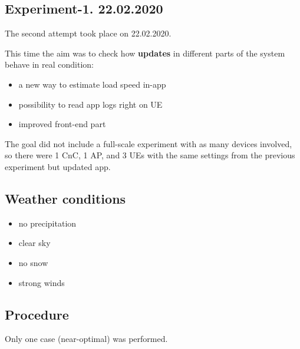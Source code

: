 \hypertarget{experiment-1.-22.02.2020}{%
\subsection{Experiment-1. 22.02.2020}\label{experiment-1.-22.02.2020}}

The second attempt took place on 22.02.2020.

This time the aim was to check how \textbf{updates} in different parts
of the system behave in real condition:

\begin{itemize}
\tightlist
\item
  a new way to estimate load speed in-app
\item
  possibility to read app logs right on UE
\item
  improved front-end part
\end{itemize}

The goal did not include a full-scale experiment with as many devices
involved, so there were 1 CnC, 1 AP, and 3 UEs with the same settings
from the previous experiment but updated app.

\hypertarget{weather-conditions}{%
\subsection{Weather conditions}\label{weather-conditions}}

\begin{itemize}
\tightlist
\item
  no precipitation
\item
  clear sky
\item
  no snow
\item
  strong winds
\end{itemize}

\hypertarget{procedure}{%
\subsection{Procedure}\label{procedure}}

Only one case (near-optimal) was performed.

